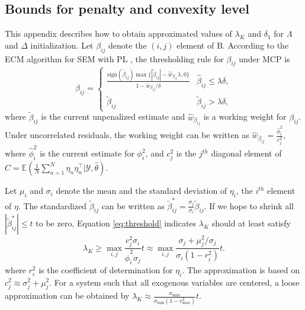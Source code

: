 \documentclass[nojss]{jss}
\begin{document}
\begin{appendix}
\section{Bounds for penalty and convexity level} \label{app:initialize}
This appendix describes how to obtain approximated values of $\lambda_K$ and $\delta_1$ for $\Lambda$ and $\Delta$ initialization. Let $\beta_{ij}$ denote the $(i,j)$ element of $\mathrm{B}$. According to the ECM algorithm for SEM with PL \citep{Huang}, the thresholding rule for $\beta_{ij}$ under MCP is
\begin{equation} \label{eq:threshold}
\hat{\beta}_{ij} =
  \begin{cases}
    \frac{\text{sign}(\tilde{\beta}_{ij}) \max \{|\tilde{\beta}_{ij}| - \hat{w}_{\beta_{ij}} \lambda,0 \} }{1- \tilde{w}_{\beta_{ij}}/\delta}       & \hat{\beta}_{ij} \leq \lambda \delta, \\
    \tilde{\beta}_{ij}  & \tilde{\beta}_{ij} > \lambda \delta,
  \end{cases}
\end{equation}
where $\tilde{\beta}_{ij}$ is the current unpenalized estimate and $ \hat{w}_{\beta_{ij}}$ is a working weight for $\beta_{ij}$. Under uncorrelated residuals, the working weight can be written as $\hat{w}_{\beta_{ij}} = \frac{\hat{\phi}_{i}^2}{c_{j}^2}$, where $\hat{\phi}_{i}^2$ is the current estimate for $\phi_{i}^2$, and $c_{j}^2$ is the $j^{th}$ diagonal element of $C = \mathbb{E}(\frac{1}{N}\sum_{n=1}^N \eta_{n} \eta_{n}^\top |\mathcal{Y}, \hat{\theta})$. 

Let $\mu_i$ and $\sigma_i$ denote the mean and the standard deviation of $\eta_i$, the $i^{th}$ element of $\eta$. The standardized $\tilde{\beta}_{ij}$ can be written as $\tilde{\beta}^{*}_{ij}=\frac{\sigma_j}{\sigma_i} \tilde{\beta}_{ij}$. If we hope to shrink all $| \tilde{\beta}^{*}_{ij}| \leq t$ to be zero, Equation \ref{eq:threshold} indicates $\lambda_K$ should at least satisfy 
\begin{equation} \label{eq:approx_lambda}
\lambda_K \geq \max_{i,j} \frac{  c_{j}^2 \sigma_i}{ \hat{\phi}_{i}^2 \sigma_j} t
\approx \max_{i,j} \frac{  \sigma_j +  \mu_j^2 / \sigma_j}{ \sigma_i(1-r_{i}^2) }t.
\end{equation}
where $r_i^2$ is the coefficient of determination for $\eta_i$. The approximation is based on $c_{j}^2 \approx \sigma_j^2 + \mu_j^2$. For a system such that all exogenous variables are centered, a loose approximation can be obtained by $\lambda_K \approx  \frac{\sigma_\text{max}}{ \sigma_\text{min}(1-r_\text{max}^2) }t$. 


\end{appendix}
\end{document}
